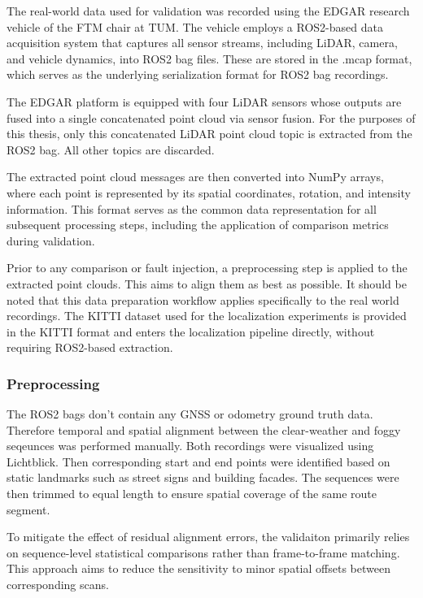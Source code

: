 The real-world data used for validation was recorded using the EDGAR research vehicle of the FTM chair at TUM. The vehicle employs a ROS2-based data acquisition system that captures all sensor streams, including LiDAR, camera, and vehicle dynamics, into ROS2 bag files. These are stored in the .mcap format, which serves as the underlying serialization format for ROS2 bag recordings.

The EDGAR platform is equipped with four LiDAR sensors whose outputs are fused into a single concatenated point cloud via sensor fusion. For the purposes of this thesis, only this concatenated LiDAR point cloud topic is extracted from the ROS2 bag. All other topics are discarded.

The extracted point cloud messages are then converted into NumPy arrays, where each point is represented by its spatial coordinates, rotation, and intensity information. %
This format serves as the common data representation for all subsequent processing steps, including the application of comparison metrics during validation.

Prior to any comparison or fault injection, a preprocessing step is applied to the extracted point clouds. This aims to align them as best as possible. 
It should be noted that this data preparation workflow applies specifically to the real world recordings. The KITTI dataset used for the localization experiments is provided in the KITTI format and enters the localization pipeline directly, without requiring ROS2-based extraction. 

\subsubsection{Preprocessing}

The ROS2 bags don't contain any GNSS or odometry ground truth data. Therefore temporal and spatial alignment between the clear-weather and foggy seqeunces was performed manually. Both recordings were visualized using Lichtblick. Then corresponding start and end points were identified based on static landmarks such as street signs and building facades. The sequences were then trimmed to equal length to ensure spatial coverage of the same route segment. 

To mitigate the effect of residual alignment errors, the validaiton primarily relies on sequence-level statistical comparisons rather than frame-to-frame
matching. This approach aims to reduce the sensitivity to minor spatial offsets between corresponding scans. 

